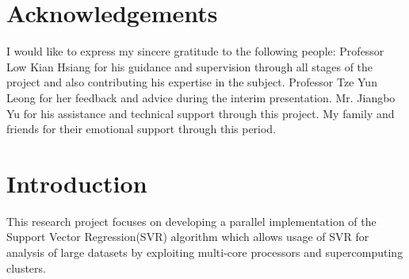 \documentclass[12pt]{article}
\newcounter{reportpage}
\begin{document}
\section*{Acknowledgements}
%
I would like to express my sincere gratitude to the following people:
\newline
\newline
Professor Low Kian Hsiang for his guidance and supervision through all stages of the project and also contributing his expertise in the subject.
\newline
\newline
Professor Tze Yun Leong for her feedback and advice during the interim presentation.
\newline
\newline
Mr. Jiangbo Yu for his assistance and technical support through this project.
\newline
\newline
My family and friends for their emotional support through this period.
\cleardoublepage
\setcounter{reportpage}{\value{page}}
\tableofcontents
\cleardoublepage
{}
\section{Introduction}
This research project focuses on developing a parallel implementation of the Support Vector Regression(SVR) algorithm which allows usage of SVR for analysis of large datasets by exploiting multi-core processors and supercomputing clusters. 
\end{document}
